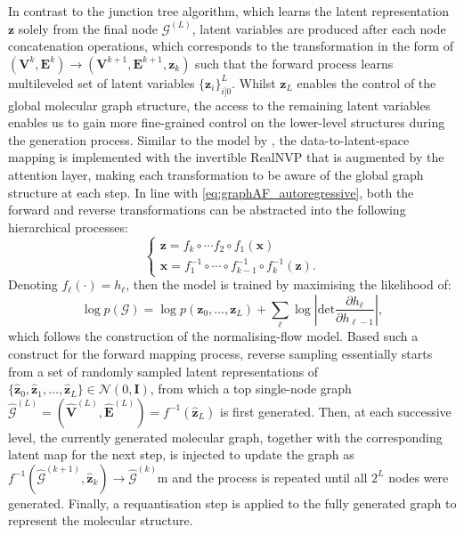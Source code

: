 In contrast to the junction tree algorithm\cite{jin2018junction}, which learns the latent representation $\bm{z}$ solely from the final node $\mathcal{G}^{(L)}$, latent variables are produced after each node concatenation operations, which corresponds to the transformation in the form of $(\bm{V}^k,\bm{E}^k)\to(\bm{V}^{k+1},\bm{E}^{k+1},\bm{z}_k)$ such that the forward process learns  multileveled set of latent variables $\{\bm{z}_i\}_{i]0}^L$. Whilst $\bm{z}_L$ enables the control of the global molecular graph structure, the access to the remaining latent variables enables us to gain more fine-grained control on the lower-level structures during the generation process. Similar to the model by \cite{liu2019graph}, the data-to-latent-space mapping is implemented with the invertible RealNVP\cite{dinh2016density} that is augmented by the attention layer, making each transformation to be aware of the global graph structure at each step. In line with \cref{eq:graphAF_autoregressive}, both the forward and reverse transformations can be abstracted into the following hierarchical processes:
\begin{equation*}
    \begin{cases}
        \bm{z}=f_k\circ \cdots f_2\circ f_1(\bm{x})\\
        \bm{x}=f_1^{-1}\circ \cdots\circ f_{k-1}^{-1}\circ f_k^{-1}(\bm{z}).
    \end{cases}
\end{equation*}
Denoting $f_\ell(\cdot)=h_{\ell}$, then the model is trained by maximising the likelihood of:
\begin{equation*}
    \log p(\mathcal{G})=\log p(\bm{z}_0,\ldots,\bm{z}_L)+\sum_\ell \log\left\vert \mbox{det} \frac{\partial h_\ell}{\partial h_{\ell-1}}\right\vert,
\end{equation*}
which follows the construction of the normalising-flow model. Based such a construct for the forward mapping process, reverse sampling essentially starts from a set of randomly sampled latent representations of $\{\hat{\bm{z}}_{0},\hat{\bm{z}}_1,\ldots,\hat{\bm{z}}_L\}\in\mathcal{N}(0,\bm{I})$, from which a top single-node graph $\hat{\mathcal{G}}^{(L)}=(\hat{\bm{V}}^{(L)},\hat{\bm{E}}^{(L)})=f^{-1}(\hat{\bm{z}}_L)$ is first generated. Then, at each successive level, the currently generated molecular graph, together with the corresponding latent map for the next step, is injected to update the graph as $f^{-1}(\hat{\mathcal{G}}^{(k+1)},\hat{\bm{z}}_k)\to\hat{\mathcal{G}}^{(k)}$m and the process is repeated until all $2^L$ nodes were generated. Finally, a requantisation step is applied to the fully generated graph to represent the molecular structure.


